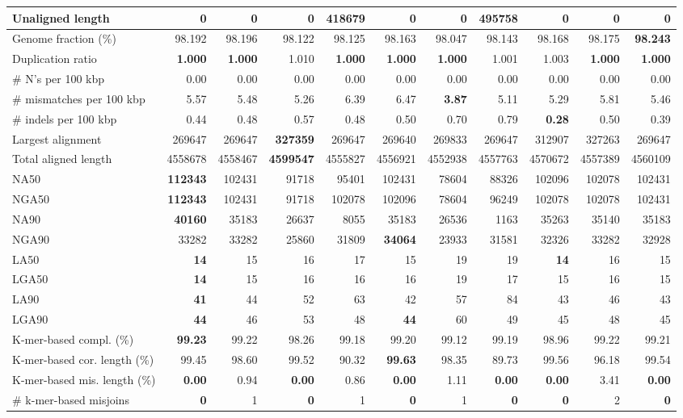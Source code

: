 \documentclass[12pt,a4paper]{article}
\begin{document}
\begin{table}[ht]
\begin{center}
\begin{tabular}{|l*{10}{|r}|}
Unaligned length & {\bf 0} & {\bf 0} & {\bf 0} & 418679 & {\bf 0} & {\bf 0} & 495758 & {\bf 0} & {\bf 0} & {\bf 0} \\ \hline
Genome fraction (\%) & 98.192 & 98.196 & 98.122 & 98.125 & 98.163 & 98.047 & 98.143 & 98.168 & 98.175 & {\bf 98.243} \\ \hline
Duplication ratio & {\bf 1.000} & {\bf 1.000} & 1.010 & {\bf 1.000} & {\bf 1.000} & {\bf 1.000} & 1.001 & 1.003 & {\bf 1.000} & {\bf 1.000} \\ \hline
\# N's per 100 kbp & 0.00 & 0.00 & 0.00 & 0.00 & 0.00 & 0.00 & 0.00 & 0.00 & 0.00 & 0.00 \\ \hline
\# mismatches per 100 kbp & 5.57 & 5.48 & 5.26 & 6.39 & 6.47 & {\bf 3.87} & 5.11 & 5.29 & 5.81 & 5.46 \\ \hline
\# indels per 100 kbp & 0.44 & 0.48 & 0.57 & 0.48 & 0.50 & 0.70 & 0.79 & {\bf 0.28} & 0.50 & 0.39 \\ \hline
Largest alignment & 269647 & 269647 & {\bf 327359} & 269647 & 269640 & 269833 & 269647 & 312907 & 327263 & 269647 \\ \hline
Total aligned length & 4558678 & 4558467 & {\bf 4599547} & 4555827 & 4556921 & 4552938 & 4557763 & 4570672 & 4557389 & 4560109 \\ \hline
NA50 & {\bf 112343} & 102431 & 91718 & 95401 & 102431 & 78604 & 88326 & 102096 & 102078 & 102431 \\ \hline
NGA50 & {\bf 112343} & 102431 & 91718 & 102078 & 102096 & 78604 & 96249 & 102078 & 102078 & 102431 \\ \hline
NA90 & {\bf 40160} & 35183 & 26637 & 8055 & 35183 & 26536 & 1163 & 35263 & 35140 & 35183 \\ \hline
NGA90 & 33282 & 33282 & 25860 & 31809 & {\bf 34064} & 23933 & 31581 & 32326 & 33282 & 32928 \\ \hline
LA50 & {\bf 14} & 15 & 16 & 17 & 15 & 19 & 19 & {\bf 14} & 16 & 15 \\ \hline
LGA50 & {\bf 14} & 15 & 16 & 16 & 16 & 19 & 17 & 15 & 16 & 15 \\ \hline
LA90 & {\bf 41} & 44 & 52 & 63 & 42 & 57 & 84 & 43 & 46 & 43 \\ \hline
LGA90 & {\bf 44} & 46 & 53 & 48 & {\bf 44} & 60 & 49 & 45 & 48 & 45 \\ \hline
K-mer-based compl. (\%) & {\bf 99.23} & 99.22 & 98.26 & 99.18 & 99.20 & 99.12 & 99.19 & 98.96 & 99.22 & 99.21 \\ \hline
K-mer-based cor. length (\%) & 99.45 & 98.60 & 99.52 & 90.32 & {\bf 99.63} & 98.35 & 89.73 & 99.56 & 96.18 & 99.54 \\ \hline
K-mer-based mis. length (\%) & {\bf 0.00} & 0.94 & {\bf 0.00} & 0.86 & {\bf 0.00} & 1.11 & {\bf 0.00} & {\bf 0.00} & 3.41 & {\bf 0.00} \\ \hline
\# k-mer-based misjoins & {\bf 0} & 1 & {\bf 0} & 1 & {\bf 0} & 1 & {\bf 0} & {\bf 0} & 2 & {\bf 0} \\ \hline
\end{tabular}
\end{center}
\end{table}
\end{document}

